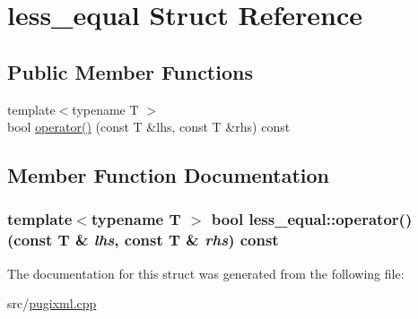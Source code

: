 \hypertarget{structless__equal}{
\section{less\_\-equal Struct Reference}
\label{structless__equal}
}
\subsection*{Public Member Functions}
\begin{DoxyCompactItemize}
\item 
{\footnotesize template$<$typename T $>$ }\\bool \hyperlink{structless__equal_a3c9dc6cda82c38a6ec895ba179b89572}{operator()} (const T \&lhs, const T \&rhs) const 
\end{DoxyCompactItemize}


\subsection{Member Function Documentation}
\hypertarget{structless__equal_a3c9dc6cda82c38a6ec895ba179b89572}{
\subsubsection[{operator()}]{\setlength{\rightskip}{0pt plus 5cm}template$<$typename T $>$ bool less\_\-equal::operator() (const T \& {\em lhs}, \/  const T \& {\em rhs}) const}}
\label{structless__equal_a3c9dc6cda82c38a6ec895ba179b89572}


The documentation for this struct was generated from the following file:\begin{DoxyCompactItemize}
\item 
src/\hyperlink{pugixml_8cpp}{pugixml.cpp}\end{DoxyCompactItemize}
